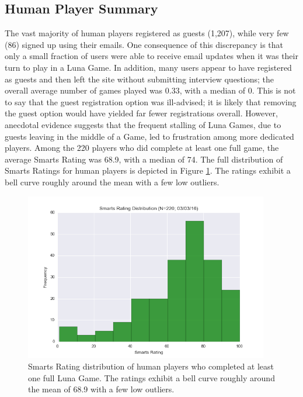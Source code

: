 \subsection{Human Player Summary}

The vast majority of human players registered as guests (1,207), while very few (86) signed up using their emails. One consequence of this discrepancy is that only a small fraction of users were able to receive email updates when it was their turn to play in a Luna Game. In addition, many users appear to have registered as guests and then left the site without submitting interview questions; the overall average number of games played was 0.33, with a median of 0. This is not to say that the guest registration option was ill-advised; it is likely that removing the guest option would have yielded far fewer registrations overall. However, anecdotal evidence suggests that the frequent stalling of Luna Games, due to guests leaving in the middle of a Game, led to frustration among more dedicated players. Among the 220 players who did complete at least one full game, the average Smarts Rating was 68.9, with a median of 74. The full distribution of Smarts Ratings for human players is depicted in Figure \ref{humansmartsratings}. The ratings exhibit a bell curve roughly around the mean with a few low outliers. 


\begin{figure}
\includegraphics[width=0.95\textwidth]{figures/ratingDistribution.png}
\caption{\label{humansmartsratings} Smarts Rating distribution of human players who completed at least one full Luna Game. The ratings exhibit a bell curve roughly around the mean of 68.9 with a few low outliers.}
\end{figure}

